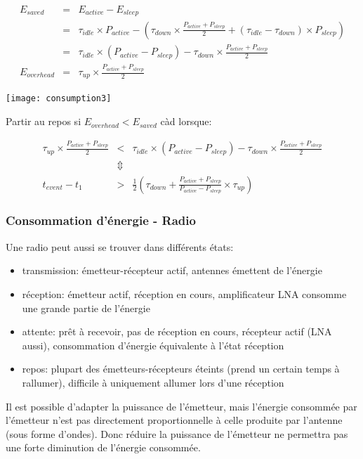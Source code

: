 \documentclass{article}
\begin{document}
\begin{sffamily}
$$\begin{array}{rcl}
E_{saved} & = & E_{active} - E_{sleep} \\
        & = & \tau_{idle} \times P_{active} -
              (\tau_{down} \times \frac{P_{active} + P_{sleep}}{2} +
              (\tau_{idle} - \tau_{down}) \times P_{sleep}) \\
        & = & \tau_{idle} \times (P_{active} - P_{sleep}) - \tau_{down} \times
              \frac{P_{active} + P_{sleep}}{2}\\
E_{overhead} & = & \tau_{up} \times \frac{P_{active} + P_{sleep}}{2}
\end{array}$$

\texttt{[image: consumption3]}

Partir au repos si $E_{overhead} < E_{saved}$
càd lorsque:

$$\begin{array}{rcl}
  \tau_{up} \times \frac{P_{active} + P_{sleep}}{2} & < &
  \tau_{idle} \times (P_{active}-P_{sleep})-\tau_{down} \times
  \frac{P_{active} + P_{sleep}}{2}\\
  & \Updownarrow & \\
  t_{event} - t_1 & > & \frac{1}{2}(\tau_{down} +
  \frac{P_{active} + P_{sleep}}{P_{active} - P_{sleep}} \times \tau_{up})
\end{array}$$

\subsubsection{Consommation d'énergie - Radio}
Une radio peut aussi se trouver dans différents états:
\begin{itemize}
\item transmission:
  émetteur-récepteur actif, antennes émettent de l'énergie
\item réception:
  émetteur actif, réception en cours, amplificateur LNA consomme une
  grande partie de l'énergie
\item attente:
  prêt à recevoir, pas de réception en cours, récepteur actif (LNA aussi),
  consommation d'énergie équivalente à l'état réception
\item repos:
  plupart des émetteurs-récepteurs éteints (prend un certain temps à rallumer),
  difficile à uniquement allumer lors d'une réception
\end{itemize}

Il est possible d'adapter la puissance de l'émetteur, mais l'énergie consommée
par l'émetteur n'est pas directement proportionnelle à celle produite par
l'antenne (sous forme d'ondes).
Donc réduire la puissance de l'émetteur ne permettra pas une
forte diminution de l'énergie consommée.


\end{sffamily}
\end{document}
